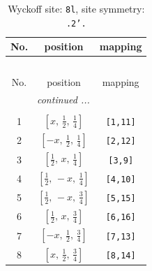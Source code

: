 \documentclass[fleqn,8pt]{jsarticle}
\begin{document}
\begin{longtable}{ccc}
\caption{Wyckoff site: {\tt 8l}, site symmetry: {\tt .2'.}}
 \\
 \hline \hline
No. & position & mapping \\ \hline \endfirsthead

\multicolumn{2}{l}{\tablename\ \thetable{}} \\
 \hline \hline
No. & position & mapping \\ \hline \endhead

 \hline \hline
\multicolumn{2}{r}{\footnotesize\it continued ...} \\ \endfoot

 \hline \hline
\multicolumn{2}{r}{} \\ \endlastfoot

1 & $\left[ x,\, \frac{1}{2},\, \frac{1}{4} \right]$ & {\tt [1,11]} \\ \hline
2 & $\left[ - x,\, \frac{1}{2},\, \frac{1}{4} \right]$ & {\tt [2,12]} \\ \hline
3 & $\left[ \frac{1}{2},\, x,\, \frac{1}{4} \right]$ & {\tt [3,9]} \\ \hline
4 & $\left[ \frac{1}{2},\, - x,\, \frac{1}{4} \right]$ & {\tt [4,10]} \\ \hline
5 & $\left[ \frac{1}{2},\, - x,\, \frac{3}{4} \right]$ & {\tt [5,15]} \\ \hline
6 & $\left[ \frac{1}{2},\, x,\, \frac{3}{4} \right]$ & {\tt [6,16]} \\ \hline
7 & $\left[ - x,\, \frac{1}{2},\, \frac{3}{4} \right]$ & {\tt [7,13]} \\ \hline
8 & $\left[ x,\, \frac{1}{2},\, \frac{3}{4} \right]$ & {\tt [8,14]} \\
\end{longtable}
\renewcommand{\arraystretch}{1.2}
\end{document}
